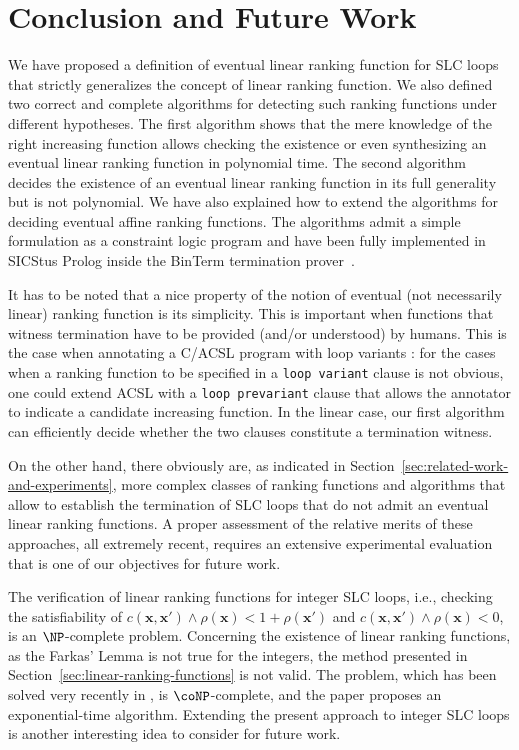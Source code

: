 \documentclass{acm_proc_article-sp}
\begin{document}
\section{Conclusion and Future Work}
\label{sec:conclusion-and-future-work}

We have proposed a definition of eventual linear ranking
function for SLC loops that strictly generalizes the concept
of linear ranking function.
We also defined two correct and complete algorithms for detecting such
ranking functions under different hypotheses.
The first algorithm shows that the mere knowledge
of the right increasing function allows checking the existence
or even synthesizing an eventual linear ranking function in polynomial time.
The second algorithm decides the existence of an
eventual linear ranking function in its full generality but
is not polynomial. We have also explained how to extend the algorithms
for deciding eventual affine ranking functions.
The algorithms admit a simple formulation as a constraint logic
program and have been fully implemented in SICStus Prolog inside the
BinTerm termination prover~\cite{SpotoMP10}.

It has to be noted that a nice property of the notion of eventual
(not necessarily linear) ranking function is its simplicity.
This is important when functions that witness termination have to be
provided (and/or understood) by humans.  This is the case when
annotating a C/ACSL program with loop variants \cite{BaudinCFMM+13}:
for the cases when a ranking function to be specified in a
\verb+loop variant+ clause is not obvious, one could extend ACSL with a
\verb+loop prevariant+ clause that allows the annotator
to indicate a candidate increasing function.
In the linear case, our first algorithm can efficiently decide
whether the two clauses constitute a termination witness.

On the other hand, there obviously are, as indicated
in Section~\ref{sec:related-work-and-experiments},
more complex classes of ranking functions and algorithms that allow
to establish the termination of SLC loops that do not admit an
eventual linear ranking functions.
A proper assessment of the relative merits of these approaches,
all extremely recent, requires an extensive experimental evaluation
that is one of our objectives for future work.

The verification of linear ranking functions for integer SLC loops, i.e.,
checking the satisfiability of
$c(\mathbf{x}, \mathbf{x}') \land \rho(\mathbf{x})  <  1 +  \rho(\mathbf{x}')$
and $c(\mathbf{x}, \mathbf{x}') \land \rho(\mathbf{x}) < 0$,
is an $\NP$-complete problem.
Concerning the existence of linear ranking functions,
as the Farkas' Lemma is not true for the integers,
the method presented in Section~\ref{sec:linear-ranking-functions} is not
valid.
The problem, which has been solved very recently in \cite{Ben-AmramG13},
is $\coNP$-complete, and the paper proposes an exponential-time algorithm.
Extending the present approach to integer SLC loops is another
interesting idea to consider for future work.
\end{document}
